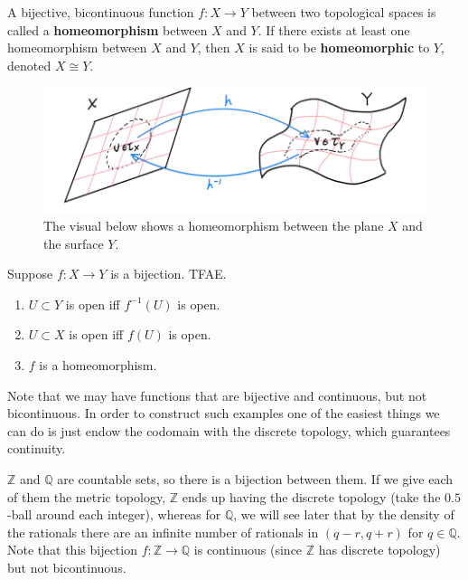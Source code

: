   \begin{definition}[Homeomorphism]
    A bijective, bicontinuous function $f: X \longrightarrow Y$ between two topological spaces is called a \textbf{homeomorphism} between $X$ and $Y$. If there exists at least one homeomorphism between $X$ and $Y$, then $X$ is said to be \textbf{homeomorphic} to $Y$, denoted $X \cong Y$. 

    \begin{figure}[H]
      \centering 
      \includegraphics[scale=0.4]{img/Homeomorphism_of_Plane.png}
      \caption{The visual below shows a homeomorphism between the plane $X$ and the surface $Y$.}
      \label{fig:homeomorphism_plane}
    \end{figure}
  \end{definition}

  \begin{theorem}
    Suppose $f: X \rightarrow Y$ is a bijection. TFAE. 
    \begin{enumerate}
      \item $U \subset Y$ is open iff $f^{-1} (U)$ is open. 
      \item $U \subset X$ is open iff $f(U)$ is open. 
      \item $f$ is a homeomorphism. 
    \end{enumerate}
  \end{theorem} 

  Note that we may have functions that are bijective and continuous, but not bicontinuous. In order to construct such examples one of the easiest things we can do is just endow the codomain with the discrete topology, which guarantees continuity. 

  \begin{example}
    $\mathbb{Z}$ and $\mathbb{Q}$ are countable sets, so there is a bijection between them. If we give each of them the metric topology, $\mathbb{Z}$ ends up having the discrete topology (take the $0.5$-ball around each integer), whereas for $\mathbb{Q}$, we will see later that by the density of the rationals there are an infinite number of rationals in $(q - r, q + r)$ for $q \in \mathbb{Q}$. Note that this bijection $f: \mathbb{Z} \rightarrow \mathbb{Q}$ is continuous (since $\mathbb{Z}$ has discrete topology) but not bicontinuous. 
  \end{example}


